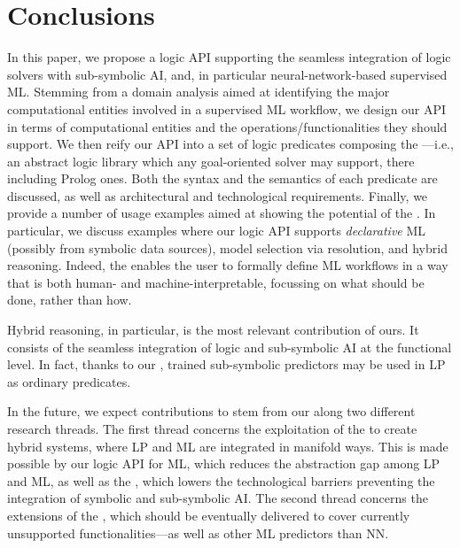 \documentclass{article}
\begin{document}
\section{Conclusions}
\label{sec:conclusions}

In this paper, we propose a logic API supporting the seamless integration of logic solvers with sub-symbolic AI, and, in particular neural-network-based supervised ML.
%
Stemming from a domain analysis aimed at identifying the major computational entities involved in a supervised ML workflow, we design our API in terms of computational entities and the operations/functionalities they should support.
%
We then reify our API into a set of logic predicates composing the \mllib{}---i.e., an abstract logic library which any goal-oriented solver may support, there including Prolog ones.
%
Both the syntax and the semantics of each predicate are discussed, as well as architectural and technological requirements.
%
Finally, we provide a number of usage examples aimed at showing the potential of the \mllib.
%
In particular, we discuss examples where our logic API supports \emph{declarative} ML (possibly from symbolic data sources), model selection via resolution, and hybrid reasoning.
%
Indeed, the \mllib{} enables the user to formally define ML workflows in a way that is both human- and machine-interpretable, focussing on what should be done, rather than how.

Hybrid reasoning, in particular, is the most relevant contribution of ours.
%
It consists of the seamless integration of logic and sub-symbolic AI at the functional level.
%
In fact, thanks to our \mllib{}, trained sub-symbolic predictors may be used in LP as ordinary predicates.


In the future, we expect contributions to stem from our \mllib{} along two different research threads.
%
The first thread concerns the exploitation of the \mllib{} to create hybrid systems, where LP and ML are integrated in manifold ways.
%
This is made possible by our logic API for ML, which reduces the abstraction gap among LP and ML, as well as the \mllib, which lowers the technological barriers preventing the integration of symbolic and sub-symbolic AI.
%
The second thread concerns the extensions of the \mllib{}, which should be eventually delivered to cover currently unsupported functionalities---as well as other ML predictors than NN.
\end{document}
